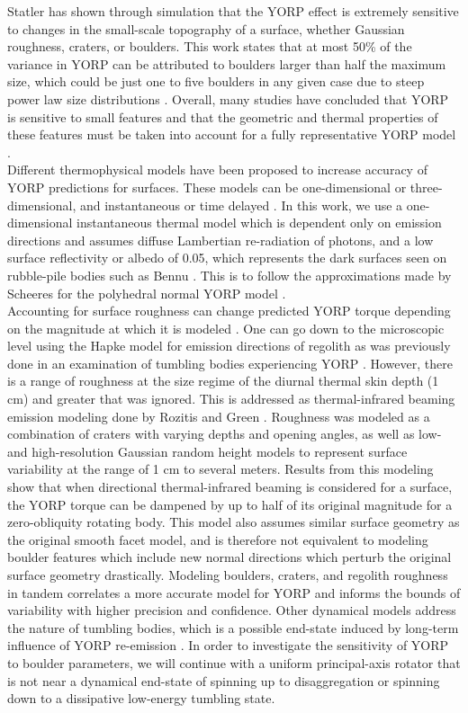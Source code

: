 Statler has shown through simulation that the YORP effect is extremely sensitive to changes in the small-scale topography of a surface, whether Gaussian roughness, craters, or boulders. This work states that at most 50\% of the variance in YORP can be attributed to boulders larger than half the maximum size, which could be just one to five boulders in any given case due to steep power law size distributions \cite{Statler2009}.  Overall, many studies have concluded that YORP is sensitive to small features and that the geometric and thermal properties of these features must be taken into account for a fully representative YORP model \cite{Breiter2009}. 
\\ \indent Different thermophysical models have been proposed to increase accuracy of YORP predictions for surfaces. These models can be one-dimensional or three-dimensional, and instantaneous or time delayed \cite{Rozitis2012}. In this work, we use a one-dimensional instantaneous thermal model which is dependent only on emission directions and assumes diffuse Lambertian re-radiation of photons, and a low surface reflectivity or albedo of 0.05, which represents the dark surfaces seen on rubble-pile bodies such as Bennu \cite{Golish2021}. This is to follow the approximations made by Scheeres for the polyhedral normal YORP model \cite{Scheeres2007}.
\\ \indent Accounting for surface roughness can change predicted YORP torque depending on the magnitude at which it is modeled \cite{Davidsson2014} \cite{Davidsson2015}. One can go down to the microscopic level using the Hapke model for emission directions of regolith as was previously done in an examination of tumbling bodies experiencing YORP \cite{Breiter2011a}.  However, there is a range of roughness at the size regime of the diurnal thermal skin depth (1 cm) and greater that was ignored. This is addressed as thermal-infrared beaming emission modeling done by Rozitis and Green \cite{Rozitis2011}. Roughness was modeled as a combination of craters with varying depths and opening angles, as well as low- and high-resolution Gaussian random height models to represent surface variability at the range of 1 cm to several meters. Results from this modeling show that when directional thermal-infrared beaming is considered for a surface, the YORP torque can be dampened by up to half of its original magnitude for a zero-obliquity rotating body. This model also assumes similar surface geometry as the original smooth facet model, and is therefore not equivalent to modeling boulder features which include new normal directions which perturb the original surface geometry drastically. Modeling boulders, craters, and regolith roughness in tandem correlates a more accurate model for YORP and informs the bounds of variability with higher precision and confidence.  Other dynamical models address the nature of tumbling bodies, which is a possible end-state induced by long-term influence of YORP re-emission \cite{Cicalo2010} \cite{Breiter2015}.  In order to investigate the sensitivity of YORP to boulder parameters, we will continue with a uniform principal-axis rotator that is not near a dynamical end-state of spinning up to disaggregation or spinning down to a dissipative low-energy tumbling state. 

